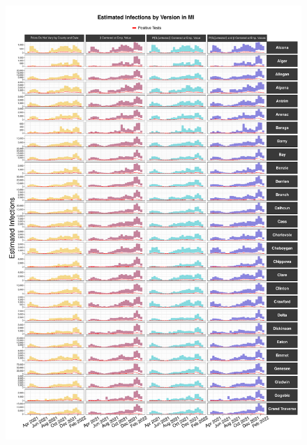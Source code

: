 \documentclass[12pt,twoside]{smiththesis}
\begin{document}
\begin{figure}
\includegraphics[width=1\linewidth]{figure/mi1_pb_compared_to_observed} \caption{\label{fig:pb_versions_mi}}\label{fig:unnamed-chunk-25-1}
\end{figure}
\end{document}
